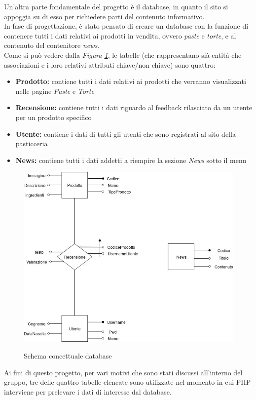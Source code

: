 Un'altra parte fondamentale del progetto è il database, in quanto il sito si appoggia su di esso per richiedere parti del contenuto informativo.\\ 
In fase di progettazione, è stato pensato di creare un database con la funzione di contenere tutti i dati relativi ai prodotti in vendita, ovvero \emph{paste} e \emph{torte}, 
e al contenuto del contenitore \emph{news}.\\
Come si può vedere dalla \emph{Figura \ref{Fig:schemadb}}, le tabelle (che rappresentano sià entità che associazioni e i loro relativi attributi chiave/non chiave) sono quattro:
\begin{itemize}
		\item \textbf{Prodotto:} contiene tutti i dati relativi ai prodotti che verranno visualizzati nelle pagine \emph{Paste} e \emph{Torte}
		\item \textbf{Recensione:} contiene tutti i dati riguardo al feedback rilasciato da un utente per un prodotto specifico
		\item \textbf{Utente:} contiene i dati di tutti gli utenti che sono registrati al sito della pasticceria
		\item \textbf{News:} contiene tutti i dati addetti a riempire la sezione \emph{News} sotto il menu 
\end{itemize}
\begin{figure}[!h]
	\centering
	\includegraphics[width=0.7\linewidth]{sezioni/Progettazione/Immagini/schema_concettuale.jpg}\\
    \caption{Schema concettuale database}
	\label{Fig:schemadb}
\end{figure}
Ai fini di questo progetto, per vari motivi che sono stati discussi all'interno del gruppo, tre delle quattro tabelle elencate sono utilizzate nel momento in cui PHP interviene per 
prelevare i dati di interesse dal database.\\

